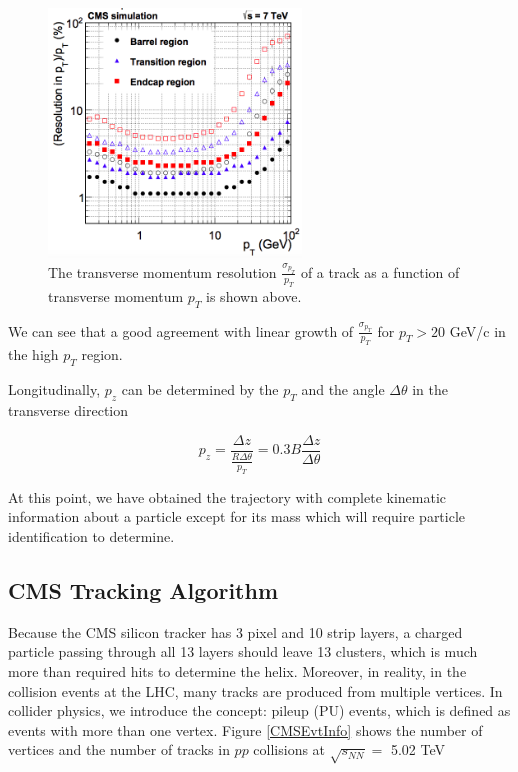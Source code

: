 \begin{figure}[hbtp]
\begin{center}
\includegraphics[width=0.60\textwidth]{Figures/Chapter4/CMSpTReso.png}
\caption{The transverse momentum resolution $\frac{\sigma_{p_T}}{p_T}$ of a track as a function of transverse momentum $p_T$ is shown above.}
\label{CMSpTReso}
\end{center}
\end{figure} 

We can see that a good agreement with linear growth of $\frac{\sigma_{p_T}}{p_T}$ for $p_T > 20$ GeV/c in the high $p_T$ region.

Longitudinally, $p_z$ can be determined by the $p_T$ and the angle $\Delta \theta$ in the transverse direction 

\begin{equation}
p_z = \frac{\Delta z}{\frac{R\Delta \theta}{p_T}} = 0.3B \frac{\Delta z}{\Delta \theta}
\end{equation}

At this point, we have obtained the trajectory with complete kinematic information about a particle except for its mass which will require particle identification to determine.

\subsection{CMS Tracking Algorithm}


Because the CMS silicon tracker has 3 pixel and 10 strip layers, a charged particle passing through all 13 layers should leave 13 clusters, which is much more than required hits to determine the helix. Moreover, in reality, in the collision events at the LHC, many tracks are produced from multiple vertices. In collider physics, we introduce the concept: pileup (PU) events, which is defined as events with more than one vertex. Figure \ref{CMSEvtInfo} shows the number of vertices and the number of tracks in $pp$ collisions at $\sqrt{s_{NN}} = $ 5.02 TeV

